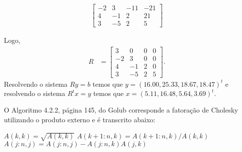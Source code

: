 \documentclass[a4paper,12pt, leqno, answers]{exam}
\begin{document}
\begin{questions}
\begin{solution}
\begin{enumerate}
\begin{align*}
\begin{bmatrix}
                        -2 & 3 & -11 & -21 \\
                        4 & -1 & 2  & 21 \\
                        3 & -5 & 2 & 5
                    \end{bmatrix}
               \end{align*}
        \end{enumerate}
        Logo,
        \begin{align*}
            R &= \begin{bmatrix}
                3 & 0 & 0 & 0 \\
                -2 & 3 & 0 & 0 \\
                4 & -1 & 2  & 0\\
                3 & -5 & 2 & 5
            \end{bmatrix}.
        \end{align*}
        Resolvendo o sistema $R y = b$ temos que $y = (16.00, 25.33, 18.67, 18.47)^t$ e resolvendo o sistema $R^t x = y$ temos que $x = (5.11, 16.48, 5.64, 3.69)^t$.
        
        O Algoritmo 4.2.2, p\'{a}gina 145, do Golub\nocite{Golub:1996:matrix} corresponde a fatora\c{c}\~{a}o de Cholesky utilizando o produto externo e \'{e} transcrito abaixo:
        \begin{algorithmic}
                \State $A(k,k) = \sqrt{A(k,k)}$
                \State $A(k + 1:n, k) = A(k + 1:n, k) / A(k,k)$
                    \State $A(j:n, j) = A(j:n, j) - A(j:n, k) A(j, k)$
                \EndFor
            \EndFor
        \end{algorithmic}


\end{solution}
\end{questions}
\end{document}
